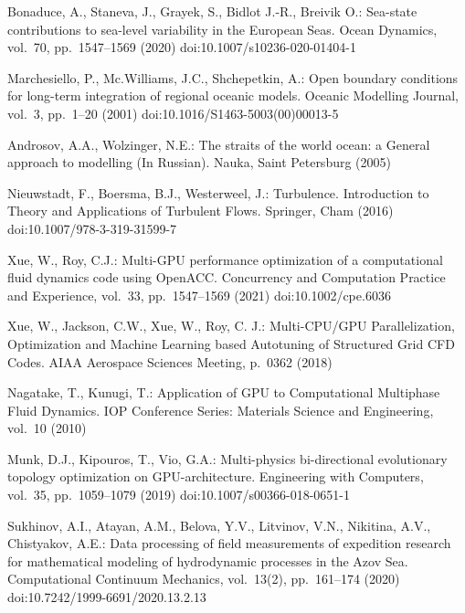 \documentclass{svproc}
\providecommand{\doi}[1]{doi:\discretionary{}{}{}#1}
\begin{document}
%
%

\begin{thebibliography}{6}
%
Bonaduce, A., Staneva, J., Grayek, S., Bidlot J.-R., Breivik O.:
Sea-state contributions to sea-level variability in the European Seas.
Ocean Dynamics,
vol.~70,
pp.~1547--1569
(2020)
\doi{10.1007/s10236-020-01404-1}

Marchesiello, P., Mc.Williams, J.C., Shchepetkin, A.:
Open boundary conditions for long-term integration of regional oceanic models.
Oceanic Modelling Journal,
vol.~3,
pp.~1--20
(2001)
\doi{10.1016/S1463-5003(00)00013-5}

Androsov, A.A., Wolzinger, N.E.:
The straits of the world ocean: a General approach to modelling (In Russian).
Nauka,
Saint Petersburg
(2005)

Nieuwstadt, F., Boersma, B.J., Westerweel, J.:
Turbulence. Introduction to Theory and Applications of Turbulent Flows.
Springer, Cham
(2016)
\doi{10.1007/978-3-319-31599-7}

Xue, W., Roy, C.J.:
Multi-GPU performance optimization of a computational fluid dynamics code using OpenACC.
Concurrency and Computation Practice and Experience,
vol.~33,
pp.~1547--1569
(2021)
\doi{10.1002/cpe.6036}

Xue, W., Jackson, C.W., Xue, W., Roy, C. J.:
Multi-CPU/GPU Parallelization, Optimization and Machine Learning based Autotuning of Structured Grid CFD Codes.
AIAA Aerospace Sciences Meeting,
p.~0362
(2018)

Nagatake, T., Kunugi, T.:
Application of GPU to Computational Multiphase Fluid Dynamics.
IOP Conference Series: Materials Science and Engineering,
vol.~10
(2010)

Munk, D.J., Kipouros, T., Vio, G.A.:
Multi-physics bi-directional evolutionary topology optimization on GPU-architecture.
Engineering with Computers,
vol.~35,
pp.~1059--1079
(2019)
\doi{10.1007/s00366-018-0651-1}

Sukhinov, A.I., Atayan, A.M., Belova, Y.V., Litvinov, V.N., Nikitina, A.V., Chistyakov, A.E.:
Data processing of field measurements of expedition research for mathematical modeling of hydrodynamic processes in the Azov Sea.
Computational Continuum Mechanics,
vol.~13(2),
pp.~161--174
(2020)
\doi{10.7242/1999-6691/2020.13.2.13}


\end{thebibliography}
\end{document}
